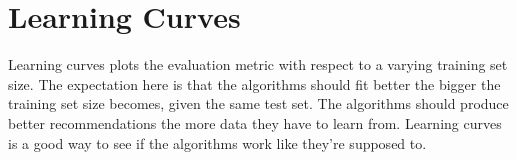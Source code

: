 
\section{Learning Curves}\label{sec:graphs:learning_curves}

Learning curves plots the evaluation metric with respect to a varying training set size. The expectation here is that the algorithms should fit better the bigger the training set size becomes, given the same test set. The algorithms should produce better recommendations the more data they have to learn from. Learning curves is a good way to see if the algorithms work like they're supposed to.














